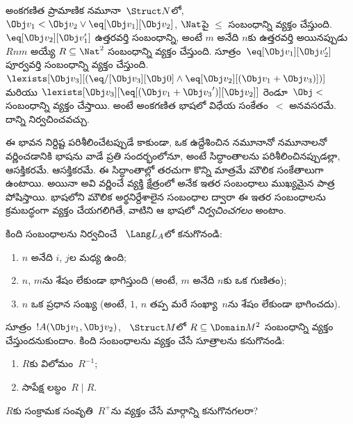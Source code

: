 \documentclass[../../../include/open-logic-section]{subfiles}
\begin{document}
\begin{ex}
అంకగణిత ప్రామాణిక నమూనా~$\Struct N$లో, 
$\Obj v_1 < \Obj v_2 \lor \eq[\Obj v_1][\Obj v_2]$, $\Nat$పై
$\le$ సంబంధాన్ని వ్యక్తం చేస్తుంది. 
$\eq[\Obj v_2][\Obj v_1']$ ఉత్తరవర్తి సంబంధాన్ని, అంటే $m$ అనేది
$n$కు ఉత్తరవర్తి అయినప్పుడు $Rnm$ అయ్యే $R \subseteq \Nat^2$
సంబంధాన్ని వ్యక్తం చేస్తుంది. సూత్రం~$\eq[\Obj v_1][\Obj v_2']$
పూర్వవర్తి సంబంధాన్ని వ్యక్తం చేస్తుంది. 
$\lexists[\Obj v_3][(\eq/[\Obj v_3][\Obj 0] \land
  \eq[\Obj v_2][(\Obj v_1 + \Obj v_3)])]$ మరియు $\lexists[\Obj
  v_3][\eq[(\Obj v_1 + {\Obj v_3}')][\Obj v_2]]$ రెండూ~$\Obj <$
సంబంధాన్ని వ్యక్తం చేస్తాయి. అంటే అంకగణిత భాషలో విధేయ సంకేతం~$<$
అనవసరమే. దాన్ని నిర్వచించవచ్చు.
\end{ex}

\begin{explain}
ఈ భావన నిర్దిష్ట  పరిశీలించేటప్పుడే కాకుండా, ఒక
ఉద్దేశించిన నమూనానో నమూనాలనో వర్ణించడానికి భాషను వాడే
ప్రతి సందర్భంలోనూ, అంటే సిద్ధాంతాలను పరిశీలించినప్పుడల్లా, ఆసక్తికరమే.
ఆసక్తికరమే. ఈ సిద్ధాంతాల్లో తరచుగా కొన్ని  మాత్రమే
మౌలిక సంకేతాలుగా ఉంటాయి. అయినా అవి వర్ణించే వ్యక్తి క్షేత్రంలో అనేక ఇతర
సంబంధాలు ముఖ్యమైన పాత్ర పోషిస్తాయి. భాషలోని మౌలిక 
అర్థనిర్దేశాలైన సంబంధాల ద్వారా ఈ ఇతర సంబంధాలను క్రమబద్ధంగా వ్యక్తం
చేయగలిగితే, వాటిని ఆ భాషలో \emph{నిర్వచించగలం} అంటాం.
\end{explain}

\begin{prob}
కింది సంబంధాలను నిర్వచించే ~$\Lang L_A$లో కనుగొనండి:
\begin{enumerate}
\item $n$ అనేది $i$, $j$ల మధ్య ఉంది;
\item $n$, $m$ను శేషం లేకుండా భాగిస్తుంది (అంటే, $m$ అనేది $n$కు
  ఒక గుణితం);
\item $n$ ఒక ప్రధాన సంఖ్య (అంటే, $1$, $n$ తప్ప మరే సంఖ్యా~$n$ను శేషం
  లేకుండా భాగించదు).
\end{enumerate}
\end{prob}

\begin{prob}
సూత్రం~$!A(\Obj v_1, \Obj v_2)$, ~$\Struct M$లో
$R \subseteq \Domain M^2$ సంబంధాన్ని వ్యక్తం చేస్తుందనుకుందాం. కింది
సంబంధాలను వ్యక్తం చేసే సూత్రాలను కనుగొనండి:
\begin{enumerate}
\item $R$కు విలోమం~$R^{-1}$;
\item సాపేక్ష లబ్ధం~$R \mid R$.
\end{enumerate}
$R$కు సంక్రామక సంవృతి~$R^+$ను వ్యక్తం చేసే మార్గాన్ని
కనుగొనగలరా?
\end{prob}
\end{document}
